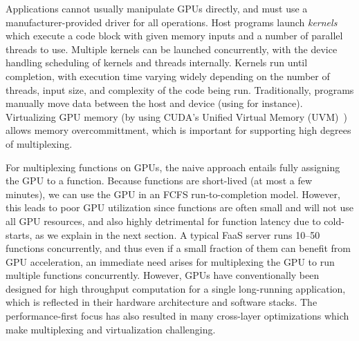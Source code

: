Applications cannot usually manipulate GPUs directly, and must use a manufacturer-provided driver for all operations.
Host programs launch \emph{kernels} which execute a code block with given memory inputs and a number of parallel threads to use.
Multiple kernels can be launched concurrently, with the device handling scheduling of kernels and threads internally.
Kernels run until completion, with execution time varying widely depending on the number of threads, input size, and complexity of the code being run. 
Traditionally, programs manually move data between the host and device (using  for instance).
Virtualizing GPU memory (by using CUDA's Unified Virtual Memory (UVM)~\cite{nvidia-uvm}) allows memory overcommittment, which is important for supporting high degrees of multiplexing.

For multiplexing functions on GPUs, the naive approach entails fully assigning the GPU to a function. 
Because functions are short-lived (at most a few minutes), we can use the GPU in an FCFS run-to-completion model. 
However, this leads to poor GPU utilization since functions are often small and will not use all GPU resources, and also highly detrimental for function latency due to cold-starts, as we explain in the next section. 
A typical FaaS server runs 10--50 functions concurrently, and thus even if a small fraction of them can benefit from GPU acceleration, an immediate need arises for multiplexing the GPU to run multiple functions concurrently. 
However, GPUs have conventionally been designed for high throughput computation for a single long-running application, which is reflected in their hardware architecture and software stacks.
The performance-first focus has also resulted in many cross-layer optimizations which make multiplexing and virtualization challenging. 


